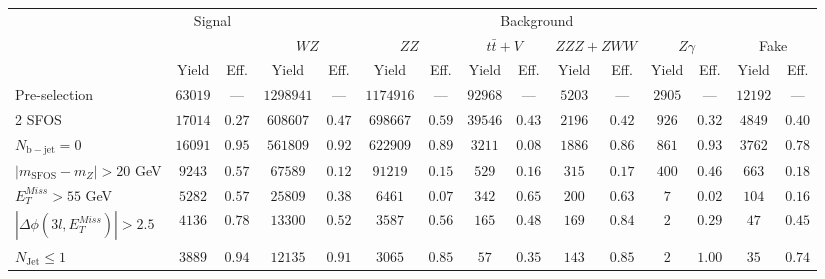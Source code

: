 \begin{tabular}{l||c|c||c|c||c|c||c|c||c|c||c|c||c|c}
\hline
 &\multicolumn{2}{c||}{Signal}            &  \multicolumn{12}{c}{Background}  \\
 & &  & \multicolumn{2}{c||}{$WZ$} & \multicolumn{2}{c||}{$ZZ$} & \multicolumn{2}{c||}{$t\bar{t}+V$} & \multicolumn{2}{c||}{$ZZZ+ZWW$} & \multicolumn{2}{c||}{$Z\gamma$} & \multicolumn{2}{c}{Fake}  \\ 
 & Yield & Eff. & Yield & Eff. & Yield & Eff. & Yield & Eff. & Yield & Eff. & Yield & Eff. & Yield & Eff. \\
\hline\hline
Pre-selection &  $63019$ & --- &  $1298941$ & --- &  $1174916$ & --- &  $92968$ & --- &  $5203$ & --- &  $2905$ & --- &  $12192$ & --- \\
\hline
2 SFOS &  $17014$ &  $0.27$ &  $608607$ &  $0.47$ &  $698667$ &  $0.59$ &  $39546$ &  $0.43$ &  $2196$ &  $0.42$ &  $926$ &  $0.32$ &  $4849$ &  $0.40$\\ 
\hline
$N_{\mathrm{b-jet}}=0$ &  $16091$ &  $0.95$ &  $561809$ &  $0.92$ &  $622909$ &  $0.89$ &  $3211$ &  $0.08$ &  $1886$ &  $0.86$ &  $861$ &  $0.93$ &  $3762$ &  $0.78$\\ 
\hline
$| m_{\mathrm{SFOS}} - m_Z | >  20$ GeV &  $9243$ &  $0.57$ &  $67589$ &  $0.12$ &  $91219$ &  $0.15$ &  $529$ &  $0.16$ &  $315$ &  $0.17$ &  $400$ &  $0.46$ &  $663$ &  $0.18$\\ 
\hline
$E_{T}^{Miss} > 55$ GeV &  $5282$ &  $0.57$ &  $25809$ &  $0.38$ &  $6461$ &  $0.07$ &  $342$ &  $0.65$ &  $200$ &  $0.63$ &  $7$ &  $0.02$ &  $104$ &  $0.16$\\ 
\hline
$|\Delta\phi(3l,E_{T}^{Miss})| > 2.5$ &  $4136$ &  $0.78$ &  $13300$ &  $0.52$ &  $3587$ &  $0.56$ &  $165$ &  $0.48$ &  $169$ &  $0.84$ &  $2$ &  $0.29$ &  $47$ &  $0.45$\\ 
\hline
$N_{\mathrm{Jet}} \leq 1$ &  $3889$ &  $0.94$ &  $12135$ &  $0.91$ &  $3065$ &  $0.85$ &  $57$ &  $0.35$ &  $143$ &  $0.85$ &  $2$ &  $1.00$ &  $35$ &  $0.74$\\ 
\hline
\end{tabular}
